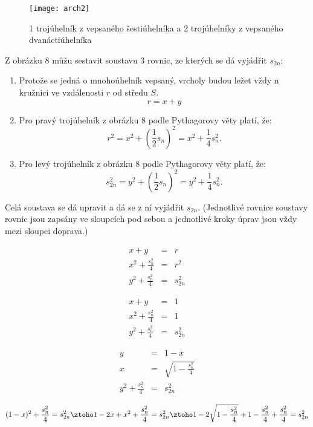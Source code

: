 \documentclass[rocnikovka]{gzwroc} %
\begin{document}
\begin{figure}[!ht]
\texttt{[image: arch2]}
\caption{1 trojúhelník z vepsaného šestiúhelníka a 2 trojúhelníky z vepsaného dvanáctiúhelníka}
\label{fig:kruh}
\end{figure}
Z obrázku 8 můžu sestavit soustavu 3 rovnic, ze kterých se dá vyjádřit $s_{2n}$:
\begin{enumerate}
\item Protože se jedná o mnohoúhelník vepsaný, vrcholy budou ležet vždy n kružnici ve vzdálenosti $r$ od středu $S$.
$$
r = x+y
$$
\item Pro pravý trojúhelník z obrázku 8 podle Pythagorovy věty platí, že:
$$
r^2=x^2+\left(\frac{1}{2}s_n\right)^2=x^2+\frac{1}{4}s_n^2.
$$
\item Pro levý trojúhelník z obrázku 8 podle Pythagorovy věty platí, že:
$$
s_{2n}^2=y^2+\left(\frac{1}{2}s_n\right)^2=y^2+\frac{1}{4}s_n^2.
$$
\end{enumerate}
Celá soustava se dá upravit a dá se z ní vyjádřit $s_{2n}$. (Jednotlivé rovnice soustavy rovnic jsou zapsány ve sloupcích pod sebou a jednotlivé kroky úprav jsou vždy mezi sloupci doprava.)
\begin{minipage}[t]{0.3\textwidth}
\begin{eqnarray}
x+y &=& r \nonumber \\
x^2+\frac{s_n^2}{4}&=&r^2\nonumber\\
y^2+\frac{s_n^2}{4}&=&s_{2n}^2\nonumber
\end{eqnarray}
\end{minipage}\hfill
\begin{minipage}[t]{0.3\textwidth}
\begin{eqnarray}
x+y &=& 1 \nonumber \\
x^2+\frac{s_n^2}{4}&=&1\nonumber\\
y^2+\frac{s_n^2}{4}&=&s_{2n}^2\nonumber
\end{eqnarray}
\end{minipage}\hfill
\begin{minipage}[t]{0.3\textwidth}
\begin{eqnarray}
y &=& 1-x \nonumber \\
x&=&\sqrt{1-\frac{s_n^2}{4}}\nonumber\\
y^2+\frac{s_n^2}{4}&=&s_{2n}^2\nonumber
\end{eqnarray}
\end{minipage}\hfill
$$
(1-x)^2+\frac{s_n^2}{4}=s_{2n}^2 \ztoho 1-2x+x^2+\frac{s_n^2}{4}=s_{2n}^2 \ztoho 1-2\sqrt{1-\frac{s_n^2}{4}}+1-\frac{s_n^2}{4}+\frac{s_n^2}{4}=s_{2n}^2
$$
\end{document}
